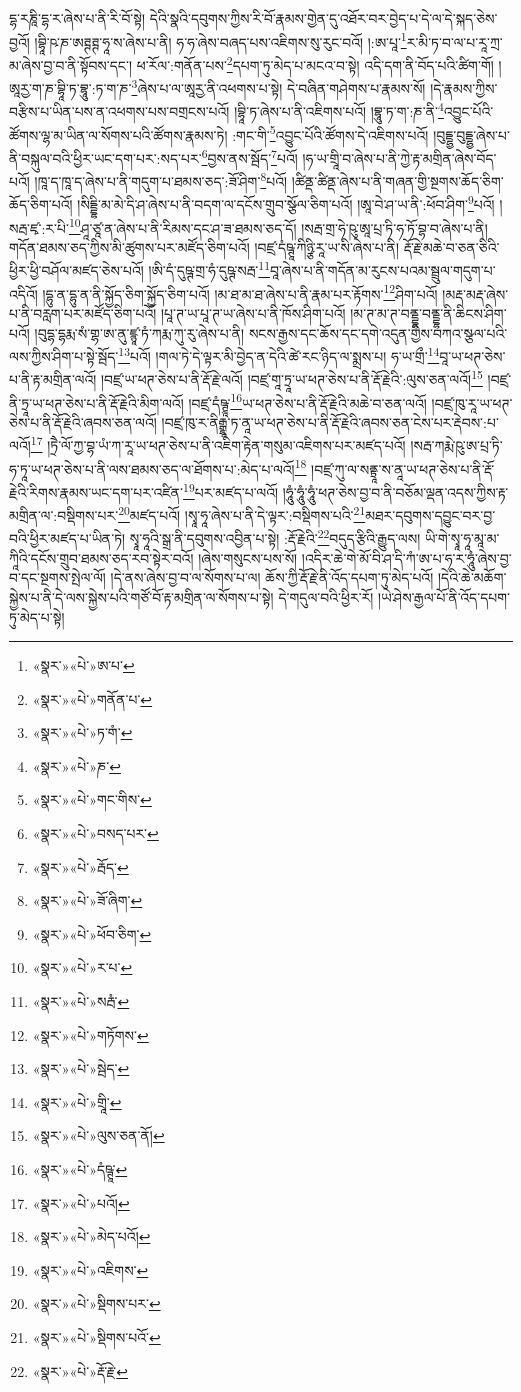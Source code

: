 དྷ་རཎཱི་དྷ་ར་ཞེས་པ་ནི་རི་བོ་སྟེ། དེའི་སྣའི་དབུགས་ཀྱིས་རི་བོ་རྣམས་གྱེན་དུ་འཐོར་བར་བྱེད་པ་དེ་ལ་དེ་སྐད་ཅེས་བྱའོ། །བྷཱི་ཥ་ཎ་ཨཊྚཊྚ་ཧཱ་ས་ཞེས་པ་ནི། ཧ་ཧ་ཞེས་བཞད་པས་འཇིགས་སུ་རུང་བའོ། །:ཨ་པཱ་\footnote{«སྣར་»«པེ་»ཨ་པ་}ར་མི་ཏ་བ་ལ་པ་རཱ་ཀྲ་མ་ཞེས་བྱ་བ་ནི་སྟོབས་དང་། ཕ་རོལ་:གནོན་པས་\footnote{«སྣར་»«པེ་»གནོན་པ་}དཔག་ཏུ་མེད་པ་མངའ་བ་སྟེ། འདི་དག་ནི་བོད་པའི་ཚིག་གོ། །ཨཱརྱ་ག་ཎ་བྷཱི་ཏ་བྷཱུ་:ཏ་ག་ཎ་\footnote{«སྣར་»«པེ་»ཏ་གཾ་}ཞེས་པ་ལ་ཨཱརྱ་ནི་འཕགས་པ་སྟེ། དེ་བཞིན་གཤེགས་པ་རྣམས་སོ། །དེ་རྣམས་ཀྱིས་བརྩིས་པ་ཡིན་པས་ན་འཕགས་པས་བགྲངས་པའོ། །བྷཱི་ཏ་ཞེས་པ་ནི་འཇིགས་པའོ། །བྷཱུ་ཏ་ག་:ཎ་ནི་\footnote{«སྣར་»«པེ་»ཎ་}འབྱུང་པོའི་ཚོགས་ལྷ་མ་ཡིན་ལ་སོགས་པའི་ཚོགས་རྣམས་ཏེ། :གང་གི་\footnote{«སྣར་»«པེ་»གང་གིས་}འབྱུང་པོའི་ཚོགས་དེ་འཇིགས་པའོ། །བུདྡྷྱ་བུདྡྷྱ་ཞེས་པ་ནི་བསྐུལ་བའི་ཕྱིར་ཡང་དག་པར་:སད་པར་\footnote{«སྣར་»«པེ་»བསད་པར་}བྱས་ནས་སྦོད་\footnote{«སྣར་»«པེ་»རྦོད་}པའོ། །ཧ་ཡ་གྲཱི་བ་ཞེས་པ་ནི་ཀྱེ་རྟ་མགྲིན་ཞེས་བོད་པའོ། །ཁཱ་ད་ཁཱ་ད་ཞེས་པ་ནི་གདུག་པ་ཐམས་ཅད་:ཟོ་ཤིག་\footnote{«སྣར་»«པེ་»ཟོ་ཞིག་}པའོ། །ཚིནྡ་ཚིནྡ་ཞེས་པ་ནི་གཞན་གྱི་སྔགས་ཆོད་ཅིག་ཆོད་ཅིག་པའོ། །སིདྡྷི་མ་མེ་དི་ཤ་ཞེས་པ་ནི་བདག་ལ་དངོས་གྲུབ་སྩོལ་ཅིག་པའོ། །ཨཱ་བེ་ཤ་ཡ་ནི་:ཕོབ་ཤིག་\footnote{«སྣར་»«པེ་»ཕོབ་ཅིག་}པའོ། །སརྦ་ཛྭ་:ར་པི་\footnote{«སྣར་»«པེ་»ར་པ་}ཤཱ་ཙཱ་ན་ཞེས་པ་ནི་རིམས་དང་ཤ་ཟ་ཐམས་ཅད་དོ། །སརྦ་གྲ་ཧེ་ཥུ་ཨཱ་པྲ་ཏི་ཧ་ཏོ་བྷ་བ་ཞེས་པ་ནི། གདོན་ཐམས་ཅད་ཀྱིས་མི་ཚུགས་པར་མཛོད་ཅིག་པའོ། །བཛྲ་དཾཥྚཱ་ཀིཉྩི་རཱ་ཡ་སི་ཞེས་པ་ནི། རྡོ་རྗེ་མཆེ་བ་ཅན་ཅིའི་ཕྱིར་ཕྱི་བཤོལ་མཛད་ཅེས་པའོ། །ཨི་དཾ་དུཥྚ་གྲ་ཧཾ་དུཥྚ་སརྦ་\footnote{«སྣར་»«པེ་»སརྦཾ་}བཱ་ཞེས་པ་ནི་གདོན་མ་རུངས་པའམ་སྦྲུལ་གདུག་པ་འདིའོ། །དྷུ་ན་དྷུ་ན་ནི་སྐྱོད་ཅིག་སྐྱོད་ཅིག་པའོ། །མ་ཐ་མ་ཐ་ཞེས་པ་ནི་རྣམ་པར་རྟོགས་\footnote{«སྣར་»«པེ་»གཏོགས་}ཤིག་པའོ། །མརྡ་མརྡ་ཞེས་པ་ནི་བརླག་པར་མཛོད་ཅིག་པའོ། །པཱ་ཊ་ཡ་པཱ་ཊ་ཡ་ཞེས་པ་ནི་ཁོས་ཤིག་པའོ། །མ་ཊ་མ་ཊ་བནྡྷ་བནྡྷ་ནི་ཆིངས་ཤིག་པའོ། །བུདྷ་དྷརྨ་སཾ་གྷ་ཨ་ནུ་ཛྙཱ་ཏཾ་ཀརྨ་ཀུ་རུ་ཞེས་པ་ནི། སངས་རྒྱས་དང་ཆོས་དང་དགེ་འདུན་གྱིས་བཀའ་སྩལ་པའི་ལས་ཀྱིས་ཤིག་པ་སྟེ་སྦོད་\footnote{«སྣར་»«པེ་»སྦེད་}པའོ། །གལ་ཏེ་དེ་ལྟར་མི་བྱེད་ན་དེའི་ཚེ་རང་ཉིད་ལ་སྨྲས་པ། ཧ་ཡ་གྲྀ་\footnote{«སྣར་»«པེ་»གྲཱི་}བཱ་ཡ་ཕཊ་ཅེས་པ་ནི་རྟ་མགྲིན་ལའོ། །བཛྲ་ཡ་ཕཊ་ཅེས་པ་ནི་རྡོ་རྗེ་ལའོ། །བཛྲ་གཱ་ཏྲཱ་ཡ་ཕཊ་ཅེས་པ་ནི་རྡོ་རྗེའི་:ལུས་ཅན་ལའོ།\footnote{«སྣར་»«པེ་»ལུས་ཅན་ནོ།} །བཛྲ་ནི་ཏྲཱ་ཡ་ཕཊ་ཅེས་པ་ནི་རྡོ་རྗེའི་མིག་ལའོ། །བཛྲ་དཾཥྚྲཱ་\footnote{«སྣར་»«པེ་»དཾཥྚཱ་}ཡ་ཕཊ་ཅེས་པ་ནི་རྡོ་རྗེའི་མཆེ་བ་ཅན་ལའོ། །བཛྲ་ཁུ་རཱ་ཡ་ཕཊ་ཅེས་པ་ནི་རྡོ་རྗེའི་ཞབས་ཅན་ལའོ། །བཛྲ་ཁུ་ར་ནིརྒྷཱ་ཏ་ནཱ་ཡ་ཕཊ་ཅེས་པ་ནི་རྡོ་རྗེའི་ཞབས་ཅན་ངེས་པར་རྡེབས་:པ་ལའོ།\footnote{«སྣར་»«པེ་»པའོ།} །ཏྲཻ་ལོ་ཀྱ་བྷ་ཡཾ་ཀ་རཱ་ཡ་ཕཊ་ཅེས་པ་ནི་འཇིག་རྟེན་གསུམ་འཇིགས་པར་མཛད་པའོ། །སརྦ་ཀརྨེ་ཥུ་ཨ་པྲ་ཏི་ཧ་ཏཱ་ཡ་ཕཊ་ཅེས་པ་ནི་ལས་ཐམས་ཅད་ལ་ཐོགས་པ་:མེད་པ་ལའོ།\footnote{«སྣར་»«པེ་»མེད་པའོ།} །བཛྲ་ཀུ་ལ་སནྟྲཱ་ས་ནཱ་ཡ་ཕཊ་ཅེས་པ་ནི་རྡོ་རྗེའི་རིགས་རྣམས་ཡང་དག་པར་འཛིན་\footnote{«སྣར་»«པེ་»འཇིགས་}པར་མཛད་པ་ལའོ། །ཧཱུཾ་ཧཱུཾ་ཧཱུཾ་ཕཊ་ཅེས་བྱ་བ་ནི་བཅོམ་ལྡན་འདས་ཀྱིས་རྟ་མགྲིན་ལ་:བསྡིགས་པར་\footnote{«སྣར་»«པེ་»སྡིགས་པར་}མཛད་པའོ། །སྭཱ་ཧཱ་ཞེས་པ་ནི་དེ་ལྟར་:བསྡིགས་པའི་\footnote{«སྣར་»«པེ་»སྡིགས་པའོ་}མཐར་དབུགས་དབྱུང་བར་བྱ་བའི་ཕྱིར་མཛད་པ་ཡིན་ཏེ། སྭཱ་ཧཱའི་སྒྲ་ནི་དབུགས་འབྱིན་པ་སྟེ། :རྡོ་རྗེའི་\footnote{«སྣར་»«པེ་»རྡོ་རྗེ་}བདུད་རྩིའི་རྒྱུད་ལས། ཡི་གེ་སྭཱ་ཧཱ་མཱ་མ་ཀཱིའི་དངོས་གྲུབ་ཐམས་ཅད་རབ་སྟེར་བའོ། །ཞེས་གསུངས་པས་སོ། །འདིར་ཆེ་གེ་མོ་བི་ཤ་དི་ཀཾ་ཨ་པ་ཧ་ར་ཧཱུཾ་ཞེས་བྱ་བ་དང་སྔགས་སྤེལ་ལོ། །དེ་ནས་ཞེས་བྱ་བ་ལ་སོགས་པ་ལ། ཆོས་ཀྱི་རྡོ་རྗེ་ནི་འོད་དཔག་ཏུ་མེད་པའོ། །དེའི་ཆེ་མཆོག་སྐྱེས་པ་ནི་དེ་ལས་སྐྱེས་པའི་གཙོ་བོ་རྟ་མགྲིན་ལ་སོགས་པ་སྟེ། དེ་གདུལ་བའི་ཕྱིར་རོ། །ཡེ་ཤེས་རྒྱལ་པོ་ནི་འོད་དཔག་ཏུ་མེད་པ་སྟེ། 